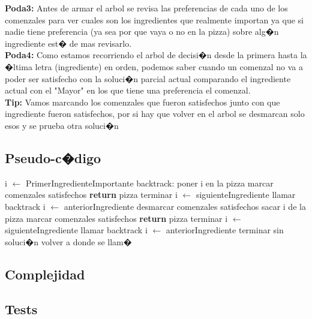 \documentclass[11pt, a4paper, spanish]{article}
\begin{document}
	\textbf{Poda3:} Antes de armar el arbol se revisa las preferencias de cada uno de los comenzales para ver cuales son los ingredientes que realmente importan ya que si nadie tiene preferencia (ya sea por que vaya o no en la pizza) sobre alg�n ingrediente est� de mas revisarlo.\\
	\textbf{Poda4:} Como estamos recorriendo el arbol de decisi�n desde la primera hasta la �ltima letra (ingrediente) en orden, podemos saber cuando un comenzal no va a poder ser satisfecho con la soluci�n parcial actual comparando el ingrediente actual con el "Mayor" en los que tiene una preferencia el comenzal.\\
	\textbf{Tip:} Vamos marcando los comenzales que fueron satisfechos junto con que ingrediente fueron satisfechos, por si hay que volver en el arbol se desmarcan solo esos y se prueba otra soluci�n\\
	\subsection{Pseudo-c�digo}
	\begin{algorithmic}
	\STATE i $\gets$ PrimerIngredienteImportante
	\STATE backtrack:
	\STATE poner i en la pizza
	\STATE marcar comenzales satisfechos
		\STATE \textbf{return} pizza
		\STATE terminar
	\ELSE
			\STATE i $\gets$ siguienteIngrediente
			\STATE llamar backtrack
			\STATE i $\gets$ anteriorIngrediente
		\ENDIF
		\STATE desmarcar comenzales satisfechos
		\STATE sacar i de la pizza
		\STATE marcar comenzales satisfechos
			\STATE \textbf{return} pizza
			\STATE terminar
		\ELSE
				\STATE i $\gets$ siguienteIngrediente
				\STATE llamar backtrack
				\STATE i $\gets$ anteriorIngrediente
			\ENDIF
		\ENDIF
	\ENDIF
		\STATE terminar sin soluci�n
	\ELSE
		\STATE volver a donde se llam�
	\ENDIF
	\end{algorithmic}	
	\subsection{Complejidad}
	
	\subsection{Tests}
\end{document}
